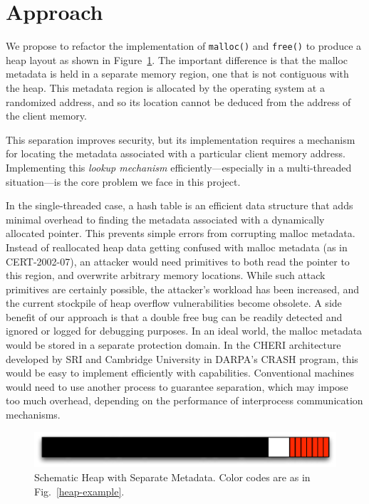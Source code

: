 \documentclass[12pt]{cslreport}
\begin{document}
\section{Approach}

We propose to refactor the implementation of \texttt{malloc()} and
\texttt{free()} to produce a heap layout as shown in
Figure~\ref{heap-split}.  The important difference is that the
malloc metadata is held in a separate memory region, one that is not
contiguous with the heap. This metadata region is allocated by the operating
system at a randomized address, and so its location cannot be deduced from the
address of the client memory.

This separation improves security, but its implementation requires a
mechanism for locating the metadata associated with a particular
client memory address.  Implementing this {\em lookup mechanism\/}
efficiently---especially in a multi-threaded situation---is the core
problem we face in this project.

In the single-threaded case, a hash table is an efficient data
structure that adds minimal overhead to finding the metadata
associated with a dynamically allocated pointer. This prevents
simple errors from corrupting malloc metadata.  Instead of reallocated
heap data getting confused with malloc metadata (as in CERT-2002-07),
an attacker would need primitives to both read the pointer to this
region, and overwrite arbitrary memory locations. While such attack
primitives are certainly possible, the attacker's workload has been
increased, and the current stockpile of heap overflow vulnerabilities
become obsolete.  A side benefit of our approach is that a double free
bug can be readily detected and ignored or logged for debugging
purposes.  In an ideal world, the malloc metadata would be stored in a
separate protection domain.  In the CHERI architecture developed by
SRI and Cambridge University in DARPA's CRASH program, this would be
easy to implement efficiently with capabilities. Conventional machines
would need to use another process to guarantee separation, which may
impose too much overhead, depending on the performance of interprocess
communication mechanisms.

\begin{figure}
\begin{center}
\includegraphics{heap-split}
\end{center}
\caption[Schematic Heap with Separate Metadata]{Schematic Heap with
  Separate Metadata. Color codes are as in Fig.~\ref{heap-example}.}
\label{heap-split}
\end{figure}
\end{document}
